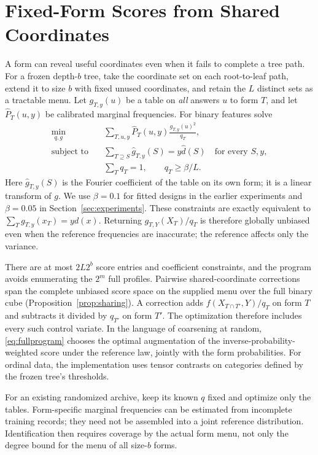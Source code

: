 \section{Fixed-Form Scores from Shared Coordinates}\label{sec:pathdesign}
A form can reveal useful coordinates even when it fails to complete a tree path. For a frozen depth-$b$ tree, take the coordinate set on each root-to-leaf path, extend it to size $b$ with fixed unused coordinates, and retain the $L$ distinct sets as a tractable menu. Let $g_{T,y}(u)$ be a table on \emph{all} answers $u$ to form $T$, and let $\widehat P_T(u,y)$ be calibrated marginal frequencies. For binary features solve
\begin{align}
 \min_{q,g}\quad&\sum_{T,u,y}\widehat P_T(u,y)
                       \frac{g_{T,y}(u)^2}{q_T},\label{eq:fullprogram}\\
 \text{subject to}\quad&\sum_{T\supseteq S}\widehat g_{T,y}(S)
                   =y\widehat d(S)\quad\text{for every }S,y,\nonumber\\
 &\sum_Tq_T=1,\qquad q_T\ge\beta/L.\nonumber
\end{align}
Here $\widehat g_{T,y}(S)$ is the Fourier coefficient of the table on its own form; it is a linear transform of $g$. We use $\beta=0.1$ for fitted designs in the earlier experiments and $\beta=0.05$ in Section~\ref{sec:experiments}. These constraints are exactly equivalent to $\sum_Tg_{T,y}(x_T)=yd(x)$. Returning $g_{T,Y}(X_T)/q_T$ is therefore globally unbiased even when the reference frequencies are inaccurate; the reference affects only the variance.

There are at most $2L2^b$ score entries and coefficient constraints, and the program avoids enumerating the $2^m$ full profiles. Pairwise shared-coordinate corrections span the complete unbiased score space on the supplied menu over the full binary cube (Proposition~\ref{prop:sharing}). A correction adds $f(X_{T\cap T'},Y)/q_T$ on form $T$ and subtracts it divided by $q_{T'}$ on form $T'$. The optimization therefore includes every such control variate. In the language of coarsening at random, \eqref{eq:fullprogram} chooses the optimal augmentation of the inverse-probability-weighted score under the reference law, jointly with the form probabilities. For ordinal data, the implementation uses tensor contrasts on categories defined by the frozen tree's thresholds.

For an existing randomized archive, keep its known $q$ fixed and optimize only the tables. Form-specific marginal frequencies can be estimated from incomplete training records; they need not be assembled into a joint reference distribution. Identification then requires coverage by the actual form menu, not only the degree bound for the menu of all size-$b$ forms.

